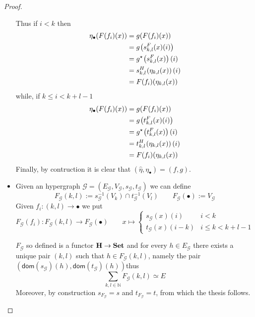 \documentclass[runningheads,envcountsect]{llncs}
\newcommand{\catname}[1]{\textbf{\textup{#1}}}
\newcommand{\dom}{\mathsf{dom}}
\begin{document}
\begin{proof}
\begin{itemize}
		Thus if $i<k$ then
		\begin{align*}
			\eta_\bullet(F(f_i)(x))&=g(F(f_i)(x))\\&=g\hspace{-1pt}\left(s^F_{k,l}(x)(i)\right)\\&=g^\star\hspace{-1pt}\left(s^F_{k,l}(x)\right)(i)\\&=s^H_{k,l}\hspace{-1pt}\left(\eta_{k,l}(x)\right)(i)\\&=F(f_i)(\eta_{k,l}(x))
		\end{align*}
		while, if $k\leq i < k+l-1$
		\begin{align*}
			\eta_\bullet(F(f_i)(x))&=g(F(f_i)(x))\\&=g\hspace{-1pt}\left(t^F_{k,l}(x)(i)\right)\\&=g^\star\hspace{-1pt}\left(t^F_{k,l}(x)\right)(i)\\&=t^H_{k,l}\hspace{-1pt}\left(\eta_{k,l}(x)\right)(i)\\&=F(f_i)(\eta_{k,l}(x))
		\end{align*}
		Finally, by contruction it is clear that $(\hat{\eta}, \eta_{\bullet})=(f,g)$. 
		\item Given an hypergraph $\mathcal{G}=(E_\mathcal{G}, V_\mathcal{G}, s_\mathcal{G}, t_\mathcal{G})$ we can define 
		\[F_{\mathcal{G}}(k,l):=s_\mathcal{G}^{-1}(V_k)\cap t_\mathcal{G}^{-1}(V_l) \qquad F_{\mathcal{G}}(\bullet):=V_\mathcal{G}\]
		Given $f_i\colon (k,l)\to \bullet$ we put
		\[F_{\mathcal{G}}(f_i)\colon F_{\mathcal{G}}(k,l)\to F_{\mathcal{G}}(\bullet) \qquad x\mapsto \begin{cases}
			s_\mathcal{G}(x)(i) & i<k\\
			t_\mathcal{G}(x) (i-k) &i\leq k < k+l-1
		\end{cases}  \]
		
		$F_{\mathcal{G}}$ so defined is a functor $\catname{H}\to \catname{Set}$ and for every $h\in E_\mathcal{G}$ there exists a unique pair $(k,l)$ such that $h\in F_{\mathcal{G}}(k,l) $, namely the pair $(\dom(s_\mathcal{G})(h), \dom(t_\mathcal{G})(h))$thus
		\[\sum_{k,l\in \mathbb{N}}F_{\mathcal{G}}(k,l)\simeq E\]
		Moreover, by construction $s_{F_{\mathcal{G}}}=s$ and $t_{F_{\mathcal{G}}}=t$, from which the thesis follows. 
	\end{itemize}
\end{proof}
\end{document}
